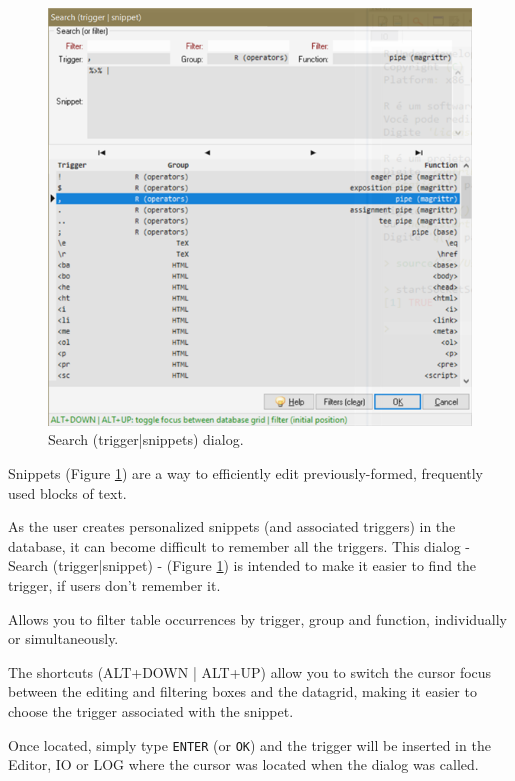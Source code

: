 \begin{figure}[H]
  \begin{center}
    \includegraphics[scale=0.80]{./res/dlg_search_trigger_snippet.png}
  \end{center}
  \caption{Search (trigger|snippets) dialog.}
  \label{fig:dlg_tinn-r_search_trigger}
\end{figure}
Snippets
(Figure \ref{fig:dlg_tinn-r_search_trigger})
are a way to efficiently edit previously-formed, frequently used blocks of text.

As the user creates personalized snippets (and associated triggers) in the database,
it can become difficult to remember all the triggers.
This dialog - Search (trigger|snippet) - (Figure \ref{fig:dlg_tinn-r_search_trigger}) is intended
to make it easier to find the trigger, if users don't remember it.

Allows you to filter table occurrences by trigger, group and function, individually or simultaneously.

The shortcuts (ALT+DOWN | ALT+UP) allow you to switch the cursor focus between the editing and
filtering boxes and the datagrid, making it easier to choose the trigger associated with the snippet.

Once located, simply type \texttt{ENTER} (or \texttt{OK}) and the trigger will be inserted in the Editor,
IO or LOG where the cursor was located when the dialog was called.

